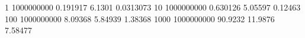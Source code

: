 1 1000000000 0.191917 6.1301 0.0313073
10 1000000000 0.630126 5.05597 0.12463
100 1000000000 8.09368 5.84939 1.38368
1000 1000000000 90.9232 11.9876 7.58477
